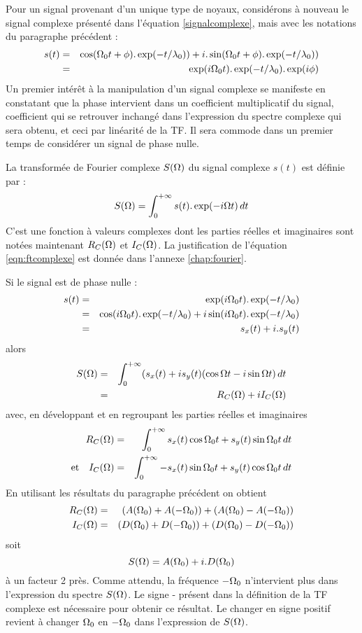 Pour un signal provenant d'un unique type de noyaux, 
considérons à nouveau le signal complexe présenté dans l'équation \ref{signalcomplexe},
mais avec les notations du paragraphe précédent :
\begin{eqnarray}
s(t) & = & 
\cos (\Omega_0 t + \phi) . \exp(-t/\lambda_0)) 
+ i.\sin (\Omega_0 t + \phi) . \exp(-t/\lambda_0)) \\
& = & \exp(i \Omega_0 t) . \exp(-t/\lambda_0) . \exp(i\phi)
\end{eqnarray}
Un premier intérêt à la manipulation d'un signal complexe se manifeste en
constatant que la phase intervient dans un coefficient multiplicatif
du signal, coefficient qui se retrouver inchangé dans l'expression
du spectre complexe qui sera obtenu, et ceci par linéarité de la TF.
Il sera commode dans un premier temps de considérer un signal de phase nulle.

La transformée de Fourier complexe 
$S(\Omega)$ du signal complexe $s(t)$ est définie par :
\begin{equation}
\label{eqn:ftcomplexe}
S(\Omega) = \int_0^{+\infty} s(t) . \exp(-i \Omega t) \, dt
\end{equation}
C'est une fonction à valeurs complexes dont les parties réelles
et imaginaires sont notées maintenant $R_C(\Omega)$ et $I_C(\Omega)$.
La justification de l'équation \ref{eqn:ftcomplexe} est donnée dans
l'annexe \ref{chap:fourier}.

Si le signal est de phase nulle :
\begin{eqnarray}
s(t) & = & \exp(i \Omega_0 t) . \exp(-t/\lambda_0) \\
& = & \cos(i \Omega_0 t) . \exp(-t/\lambda_0) + i\sin(i \Omega_0 t) . \exp(-t/\lambda_0) \\
& = & s_x(t) + i.s_y(t)
\end{eqnarray} 
alors 
\begin{eqnarray}
S(\Omega) & = & \int_0^{+\infty} (s_x(t)+is_y(t)(\cos \Omega t - i \sin \Omega t) \, dt \\
& = & R_C(\Omega) + iI_C(\Omega)
\end{eqnarray}
avec, en développant et en regroupant les parties réelles et imaginaires
\begin{eqnarray}
R_C(\Omega) & = & \int_0^{+\infty} s_x(t)\cos\Omega_0 t + s_y(t)\sin\Omega_0 t \, dt \\
\mbox{et}\quad
I_C(\Omega) & = & \int_0^{+\infty} -s_x(t)\sin\Omega_0 t + s_y(t)\cos\Omega_0 t \, dt
\end{eqnarray}
En utilisant les résultats du paragraphe précédent on obtient
\begin{eqnarray}
R_C(\Omega) & = & (A(\Omega_0) + A(-\Omega_0)) + (A(\Omega_0) - A(-\Omega_0))\\
I_C(\Omega) & = & (D(\Omega_0) + D(-\Omega_0)) + (D(\Omega_0) - D(-\Omega_0))
\end{eqnarray}
soit
\begin{equation}
S(\Omega) = A(\Omega_0) + i.D(\Omega_0)
\end{equation}
à un facteur 2 près.
Comme attendu, la fréquence $-\Omega_0$ n'intervient plus dans l'expression
du spectre $S(\Omega)$.
Le signe - présent dans la définition de la TF complexe est nécessaire pour
obtenir ce résultat. 
Le changer en signe positif revient à changer $\Omega_0$
en $-\Omega_0$ dans l'expression de $S(\Omega)$.

